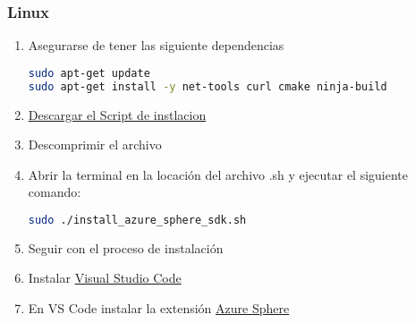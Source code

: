 \subsubsection{Linux}
\begin{enumerate}
	\item 
	Asegurarse de tener las siguiente dependencias
	\begin{lstlisting}[language=bash]
sudo apt-get update
sudo apt-get install -y net-tools curl cmake ninja-build
	\end{lstlisting}

	\item 
	\href{https://aka.ms/AzureSphereSDKInstall/Linux}{Descargar el Script de instlacion}
	\item 
	Descomprimir el archivo
	\item
	Abrir la terminal en la locación del archivo .sh y ejecutar el siguiente comando:
	\begin{lstlisting}[language=bash]
sudo ./install_azure_sphere_sdk.sh
	\end{lstlisting}
	\item 
	Seguir con el proceso de instalación
	\item 
	Instalar \href{https://code.visualstudio.com/download}{Visual Studio Code}
	\item 
	En VS Code instalar la extensión \href{https://marketplace.visualstudio.com/items?itemName=ms-vscode.azure-sphere-tools}{Azure Sphere}
\end{enumerate}